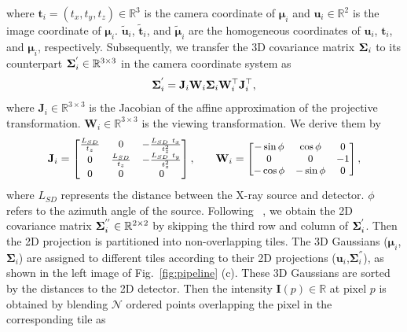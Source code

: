 \documentclass[runningheads]{llncs}
\begin{document}
where $\mathbf{t}_{i} = ({t}_{x}, {t}_{y}, {t}_{z}) \in \mathbb{R}^3$  is the camera coordinate of $\bm{\mu}_{i}$ and $\mathbf{u}_i \in \mathbb{R}^{2}$ is the image coordinate of $\bm{\mu}_i$. $\widetilde{\mathbf{u}}_i$, $\widetilde{\mathbf{t}}_i$, and $ \widetilde{\bm{\mu}}_i$ are the homogeneous coordinates of $\mathbf{u}_i$, $\mathbf{t}_{i}$, and $\bm{\mu}_{i}$, respectively. Subsequently, we transfer the 3D covariance matrix $\mathrm{\bf \Sigma}_i$ to its counterpart $\mathrm{\bf \Sigma}_i^{'} \in \mathbb{R}^{3\times 3}$ in the camera coordinate system as
\vspace{-1mm}
\begin{equation}
	\small
	\mathrm{\bf \Sigma}_i^{'} = \mathbf{J}_i \mathbf{W}_i \mathrm{\bf \Sigma}_i \mathbf{W}_i^\top \mathbf{J}_i^\top, 
 \vspace{-1mm}
\end{equation}
where $\mathbf{J}_i \in \mathbb{R}^{3\times 3}$ is the Jacobian of the affine approximation of the projective transformation. $\mathbf{W}_i \in \mathbb{R}^{3\times 3}$ is the viewing transformation. We derive them by
\vspace{-0.3mm}
\begin{equation}
	\small
	\mathbf{J}_i = 
	\begin{bmatrix}
		\frac{L_{SD}}{t_z} &0 &-\frac{L_{SD}~t_x}{t_z^2}\\
		0 & \frac{L_{SD}}{t_z} &-\frac{L_{SD}~t_y}{t_z^2} \\
		0 & 0 & 0
	\end{bmatrix},~~~~~~
	\mathbf{W}_{i} =
	\begin{bmatrix}
		-\sin\phi & \cos\phi & 0 \\
		0 & 0 & -1 \\
		-\cos\phi & -\sin\phi & 0  \\
	\end{bmatrix},
 \vspace{-1mm}
\end{equation}
where $L_{SD}$ represents the distance between the X-ray source and detector. $\phi$ refers to the azimuth angle of the source. Following ~\cite{ewa,kopanas2021point,3dgs}, we obtain the 2D covariance matrix $\mathrm{\bf \Sigma}_i^{''} \in \mathbb{R}^{2\times2}$ by skipping the third row and column of $\mathrm{\bf \Sigma}_i^{'}$. Then the 2D projection is partitioned into non-overlapping tiles. The 3D Gaussians ($\bm{\mu}_i$,$\bm{\mathbf{\Sigma}}_i$) are assigned to different tiles according to their 2D projections ($\bm{u}_i$,$\bm{\mathbf{\Sigma}}^{''}_i$), as shown in the left image of Fig.~\ref{fig:pipeline} (c). These 3D Gaussians are sorted by the distances to the 2D detector. Then the intensity $\mathbf{I}(p) \in \mathbb{R}$ at pixel $p$ is obtained by blending $\mathcal{N}$ ordered points overlapping the pixel in the corresponding tile as
\end{document}
